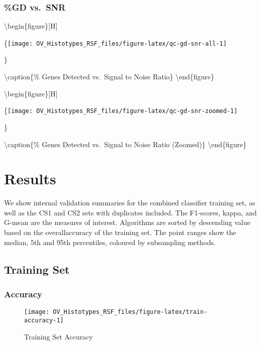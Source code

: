 \documentclass[
]{report}
\begin{document}
\hypertarget{gd-vs.-snr}{%
\subsection{\%GD vs.~SNR}\label{gd-vs.-snr}}

\textbackslash begin\{figure\}{[}H{]}

\{\centering \texttt{[image: OV\_Histotypes\_RSF\_files/figure-latex/qc-gd-snr-all-1]}

\}

\textbackslash caption\{\% Genes Detected vs.~Signal to Noise Ratio\}\label{fig:qc-gd-snr-all}
\textbackslash end\{figure\}

\textbackslash begin\{figure\}{[}H{]}

\{\centering \texttt{[image: OV\_Histotypes\_RSF\_files/figure-latex/qc-gd-snr-zoomed-1]}

\}

\textbackslash caption\{\% Genes Detected vs.~Signal to Noise Ratio (Zoomed)\}\label{fig:qc-gd-snr-zoomed}
\textbackslash end\{figure\}

\hypertarget{results}{%
\chapter{Results}\label{results}}

We show internal validation summaries for the combined classifier training set, as well as the CS1 and CS2 sets with duplicates included. The F1-scores, kappa, and G-mean are the measures of interest. Algorithms are sorted by descending value based on the overallaccuracy of the training set. The point ranges show the median, 5th and 95th percentiles, coloured by subsampling methods.

\hypertarget{training-set}{%
\section{Training Set}\label{training-set}}

\hypertarget{accuracy}{%
\subsection{Accuracy}\label{accuracy}}

\begin{figure}[H]

{\centering \texttt{[image: OV\_Histotypes\_RSF\_files/figure-latex/train-accuracy-1]} 

}

\caption{Training Set Accuracy}\label{fig:train-accuracy}
\end{figure}
\end{document}
